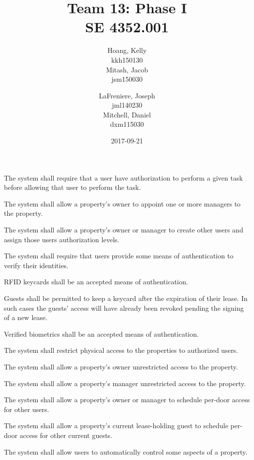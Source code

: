 \documentclass[letter,titlepage,oneside,english]{report}
\title{
  Team 13: Phase I\\
  SE 4352.001
}
\author{%
  Hoang, Kelly\\
  kkh150130\\[3ex]
  Mitash, Jacob\\
  jsm150030
  \and
  LaFreniere, Joseph\\
  jml140230\\[3ex]
  Mitchell, Daniel\\
  dxm115030
}
\date{2017-09-21}
\begin{document}
\maketitle{}

\begin{fr}
\item
  The system shall require that a user have authorization to perform a given task before allowing that user to perform the task.
  \begin{fr}
  \item
    The system shall allow a property's owner to appoint one or more managers to the property.
  \item
    The system shall allow a property's owner or manager to create other users and assign those users authorization levels.
  \item
    The system shall require that users provide some means of authentication to verify their identities.
    \begin{fr}
    \item
      RFID keycards shall be an accepted means of authentication.
      \begin{fr}
      \item
        Guests shall be permitted to keep a keycard after the expiration of their lease.
        In such cases the guests' access will have already been revoked pending the signing of a new lease.
      \end{fr}
    \item
      Verified biometrics shall be an accepted means of authentication.
    \end{fr}
  \end{fr}
\item
  The system shall restrict physical access to the properties to authorized users.
  \begin{fr}
  \item
    The system shall allow a property's owner unrestricted access to the property.
  \item
    The system shall allow a property's manager unrestricted access to the property.
  \item
    The system shall allow a property's owner or manager to schedule per-door access for other users.
  \item
    The system shall allow a property's current lease-holding guest to schedule per-door access for other current guests.
  \end{fr}
\item
  The system shall allow users to automatically control some aspects of a property.

\end{fr}
\end{document}
